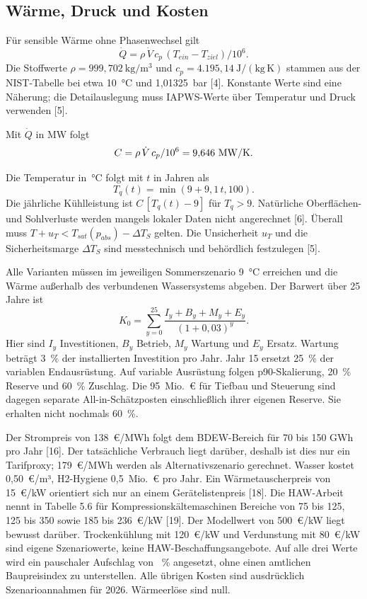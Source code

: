 \subsection{Wärme, Druck und Kosten}

Für sensible Wärme ohne Phasenwechsel gilt
\begin{equation}
\dot Q=\rho\,\dot V\,c_p\,(T_{ein}-T_{ziel})/10^6.
\label{eq:sensible}
\end{equation}
Die Stoffwerte \(\rho=999{,}702~\mathrm{kg/m^3}\) und \(c_p=4.195{,}14~\mathrm{J/(kg\,K)}\) stammen aus der NIST-Tabelle bei etwa 10~°C und 1,01325~bar [4]. Konstante Werte sind eine Näherung; die Detailauslegung muss IAPWS-Werte über Temperatur und Druck verwenden [5]. \begin{samepage}Mit \(\dot Q\) in MW folgt
\begin{equation}
C=\rho\,\dot V\,c_p/10^6=9{,}646~\mathrm{MW/K}.
\label{eq:capacity}
\end{equation}
\end{samepage}
Die Temperatur in~°C folgt mit \(t\) in Jahren als
\begin{equation}
T_q(t)=\min(9+9{,}1\,t,100).
\end{equation}
Die jährliche Kühlleistung ist \(C\,[T_q(t)-9]\) für \(T_q>9\). Natürliche Oberflächen- und Sohlverluste werden mangels lokaler Daten nicht angerechnet [6]. Überall muss \(T+u_T<T_{sat}(p_{abs})-\Delta T_S\) gelten. Die Unsicherheit \(u_T\) und die Sicherheitsmarge \(\Delta T_S\) sind messtechnisch und behördlich festzulegen [5].

Alle Varianten müssen im jeweiligen Sommerszenario 9~°C erreichen und die Wärme außerhalb des verbundenen Wassersystems abgeben. Der Barwert über 25 Jahre ist
\begin{equation}
K_0=\sum_{y=0}^{25}\frac{I_y+B_y+M_y+E_y}{(1+0{,}03)^y}.
\label{eq:npv}
\end{equation}
Hier sind \(I_y\) Investitionen, \(B_y\) Betrieb, \(M_y\) Wartung und \(E_y\) Ersatz. Wartung beträgt 3~\% der installierten Investition pro Jahr. Jahr 15 ersetzt 25~\% der variablen Endausrüstung. Auf variable Ausrüstung folgen p90-Skalierung, 20~\% Reserve und 60~\% Zuschlag. Die 95~Mio.~€ für Tiefbau und Steuerung sind dagegen separate All-in-Schätzposten einschließlich ihrer eigenen Reserve. Sie erhalten nicht nochmals 60~\%.

Der Strompreis von 138~€/MWh folgt dem BDEW-Bereich für 70 bis 150 GWh pro Jahr [16]. Der tatsächliche Verbrauch liegt darüber, deshalb ist dies nur ein Tarifproxy; 179~€/MWh werden als Alternativszenario gerechnet. Wasser kostet 0,50~€/m³, H2-Hygiene 0,5~Mio.~€ pro Jahr. Ein Wärmetauscherpreis von 15~€/kW orientiert sich nur an einem Gerätelistenpreis [18]. Die HAW-Arbeit nennt in Tabelle 5.6 für Kompressionskältemaschinen Bereiche von 75 bis 125, 125 bis 350 sowie 185 bis 236~€/kW [19]. Der Modellwert von 500~€/kW liegt bewusst darüber. Trockenkühlung mit 120~€/kW und Verdunstung mit 80~€/kW sind eigene Szenariowerte, keine HAW-Beschaffungsangebote. Auf alle drei Werte wird ein pauschaler Aufschlag von \LegacyEscalationPercent~\% angesetzt, ohne einen amtlichen Baupreisindex zu unterstellen. Alle übrigen Kosten sind ausdrücklich Szenarioannahmen für 2026. Wärmeerlöse sind null.

